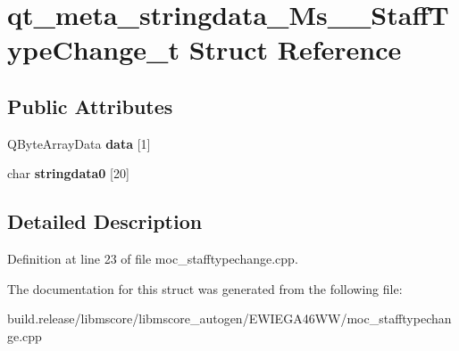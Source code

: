 \hypertarget{structqt__meta__stringdata___ms_____staff_type_change__t}{}\section{qt\+\_\+meta\+\_\+stringdata\+\_\+\+Ms\+\_\+\+\_\+\+Staff\+Type\+Change\+\_\+t Struct Reference}
\label{structqt__meta__stringdata___ms_____staff_type_change__t}
\subsection*{Public Attributes}
\begin{DoxyCompactItemize}
\item 
\mbox{\label{structqt__meta__stringdata___ms_____staff_type_change__t_affb4362edece877b1a7dce3e26625b11}} 
Q\+Byte\+Array\+Data {\bfseries data} \mbox{[}1\mbox{]}
\item 
\mbox{\label{structqt__meta__stringdata___ms_____staff_type_change__t_ac525148c7f21351565d5bb93869dc78d}} 
char {\bfseries stringdata0} \mbox{[}20\mbox{]}
\end{DoxyCompactItemize}


\subsection{Detailed Description}


Definition at line 23 of file moc\+\_\+stafftypechange.\+cpp.



The documentation for this struct was generated from the following file\+:\begin{DoxyCompactItemize}
\item 
build.\+release/libmscore/libmscore\+\_\+autogen/\+E\+W\+I\+E\+G\+A46\+W\+W/moc\+\_\+stafftypechange.\+cpp\end{DoxyCompactItemize}
